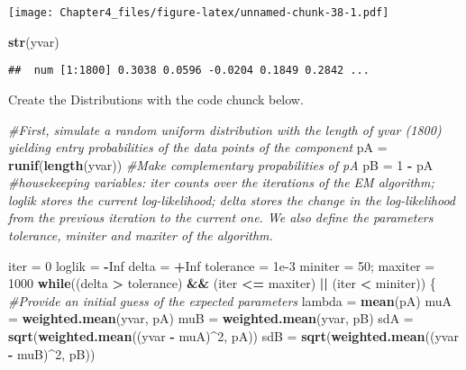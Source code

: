 \documentclass[]{article}
\newenvironment{Shaded}{\begin{snugshade}}{\end{snugshade}}
\newcommand{\CommentTok}[1]{\textcolor[rgb]{0.56,0.35,0.01}{\textit{#1}}}
\newcommand{\ControlFlowTok}[1]{\textcolor[rgb]{0.13,0.29,0.53}{\textbf{#1}}}
\newcommand{\DecValTok}[1]{\textcolor[rgb]{0.00,0.00,0.81}{#1}}
\newcommand{\FloatTok}[1]{\textcolor[rgb]{0.00,0.00,0.81}{#1}}
\newcommand{\KeywordTok}[1]{\textcolor[rgb]{0.13,0.29,0.53}{\textbf{#1}}}
\newcommand{\NormalTok}[1]{#1}
\newcommand{\OperatorTok}[1]{\textcolor[rgb]{0.81,0.36,0.00}{\textbf{#1}}}
\newcommand{\OtherTok}[1]{\textcolor[rgb]{0.56,0.35,0.01}{#1}}
\newcommand{\StringTok}[1]{\textcolor[rgb]{0.31,0.60,0.02}{#1}}
\begin{document}
\texttt{[image: Chapter4\_files/figure-latex/unnamed-chunk-38-1.pdf]}

\begin{Shaded}
\begin{Highlighting}[]
\KeywordTok{str}\NormalTok{(yvar)}
\end{Highlighting}
\end{Shaded}

\begin{verbatim}
##  num [1:1800] 0.3038 0.0596 -0.0204 0.1849 0.2842 ...
\end{verbatim}

Create the Distributions with the code chunck below.

\begin{Shaded}
\begin{Highlighting}[]
\CommentTok{#First, simulate a random uniform distribution with the length of yvar (1800) yielding entry probabilities of the data points of the component}
\NormalTok{pA =}\StringTok{ }\KeywordTok{runif}\NormalTok{(}\KeywordTok{length}\NormalTok{(yvar))}
\CommentTok{#Make complementary propabilities of pA}
\NormalTok{pB =}\StringTok{ }\DecValTok{1} \OperatorTok{-}\StringTok{ }\NormalTok{pA}
\CommentTok{#housekeeping variables: iter counts over the iterations of the EM algorithm; loglik stores the current log-likelihood; delta stores the change in the log-likelihood from the previous iteration to the current one. We also define the parameters tolerance, miniter and maxiter of the algorithm.}

\NormalTok{iter =}\StringTok{ }\DecValTok{0}
\NormalTok{loglik =}\StringTok{ }\OperatorTok{-}\OtherTok{Inf}
\NormalTok{delta =}\StringTok{ }\OperatorTok{+}\OtherTok{Inf}
\NormalTok{tolerance =}\StringTok{ }\FloatTok{1e-3}
\NormalTok{miniter =}\StringTok{ }\DecValTok{50}\NormalTok{; maxiter =}\StringTok{ }\DecValTok{1000}
\ControlFlowTok{while}\NormalTok{((delta }\OperatorTok{>}\StringTok{ }\NormalTok{tolerance) }\OperatorTok{&&}\StringTok{ }\NormalTok{(iter }\OperatorTok{<=}\StringTok{ }\NormalTok{maxiter) }\OperatorTok{||}\StringTok{ }\NormalTok{(iter }\OperatorTok{<}\StringTok{ }\NormalTok{miniter)) \{}
  \CommentTok{#Provide an initial guess of the expected parameters }
\NormalTok{  lambda =}\StringTok{ }\KeywordTok{mean}\NormalTok{(pA)}
\NormalTok{  muA =}\StringTok{ }\KeywordTok{weighted.mean}\NormalTok{(yvar, pA)}
\NormalTok{  muB =}\StringTok{ }\KeywordTok{weighted.mean}\NormalTok{(yvar, pB)}
\NormalTok{  sdA =}\StringTok{ }\KeywordTok{sqrt}\NormalTok{(}\KeywordTok{weighted.mean}\NormalTok{((yvar }\OperatorTok{-}\StringTok{ }\NormalTok{muA)}\OperatorTok{^}\DecValTok{2}\NormalTok{, pA))}
\NormalTok{  sdB =}\StringTok{ }\KeywordTok{sqrt}\NormalTok{(}\KeywordTok{weighted.mean}\NormalTok{((yvar }\OperatorTok{-}\StringTok{ }\NormalTok{muB)}\OperatorTok{^}\DecValTok{2}\NormalTok{, pB))}


\end{Highlighting}
\end{Shaded}
\end{document}

